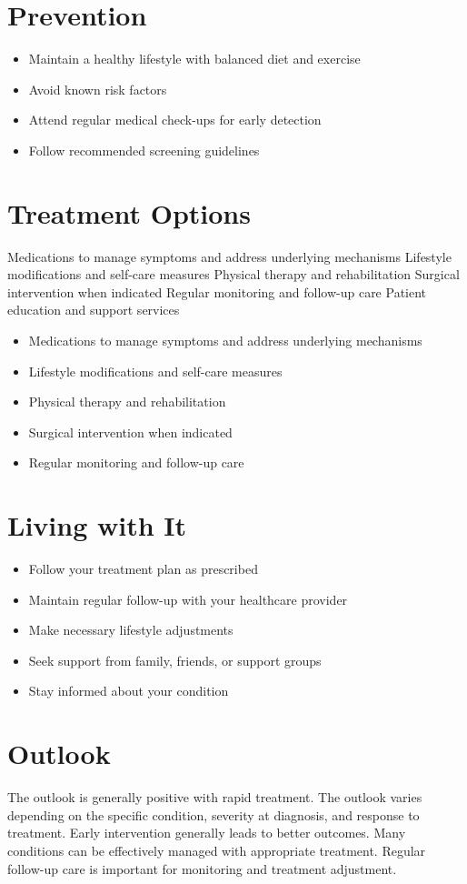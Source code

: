 \section{Prevention}
\begin{itemize}[noitemsep]
  \item Maintain a healthy lifestyle with balanced diet and exercise
  \item Avoid known risk factors
  \item Attend regular medical check-ups for early detection
  \item Follow recommended screening guidelines
\end{itemize}
\section{Treatment Options}
Medications to manage symptoms and address underlying mechanisms Lifestyle modifications and self-care measures Physical therapy and rehabilitation Surgical intervention when indicated Regular monitoring and follow-up care Patient education and support services

\begin{itemize}[noitemsep]
  \item Medications to manage symptoms and address underlying mechanisms
  \item Lifestyle modifications and self-care measures
  \item Physical therapy and rehabilitation
  \item Surgical intervention when indicated
  \item Regular monitoring and follow-up care
\end{itemize}
\section{Living with It}
\begin{itemize}[noitemsep]
  \item Follow your treatment plan as prescribed
  \item Maintain regular follow-up with your healthcare provider
  \item Make necessary lifestyle adjustments
  \item Seek support from family, friends, or support groups
  \item Stay informed about your condition
\end{itemize}
\section{Outlook}
The outlook is generally positive with rapid treatment. The outlook varies depending on the specific condition, severity at diagnosis, and response to treatment. Early intervention generally leads to better outcomes. Many conditions can be effectively managed with appropriate treatment. Regular follow-up care is important for monitoring and treatment adjustment.
